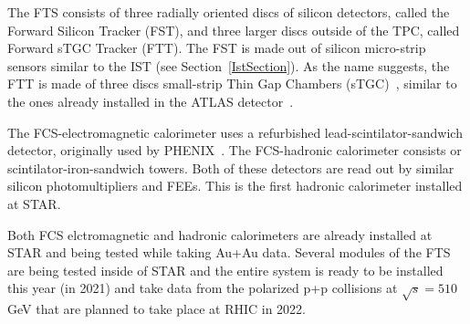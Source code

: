 The FTS consists of three radially oriented discs of silicon detectors, called the Forward Silicon Tracker (FST), and three larger discs outside of the TPC, called Forward sTGC Tracker (FTT)\@. The FST is made out of silicon micro-strip sensors similar to the IST (see Section~\ref{IstSection})\@. As the name suggests, the FTT is made of three discs small-strip Thin Gap Chambers (sTGC)~\cite{FTTproceedings}, similar to the ones already installed in the ATLAS detector~\cite{AtlasStgc}\@.
 
 The FCS-electromagnetic calorimeter uses a refurbished lead-scintilator-sandwich detector, originally used by PHENIX~\cite{PhenixCalorimeter}. The FCS-hadronic calorimeter consists or scintilator-iron-sandwich towers. Both of these detectors are read out by similar silicon photomultipliers and FEEs. This is the first hadronic calorimeter installed at STAR\@.
 
 Both FCS elctromagnetic and hadronic calorimeters are already installed at STAR and being tested while taking Au+Au data. Several modules of the FTS are being tested inside of STAR and the entire system is ready to be installed this year (in 2021) and take data from the polarized p+p collisions at $\sqrt{s} = 510\,$GeV that are planned to take place at RHIC in 2022\@. 




